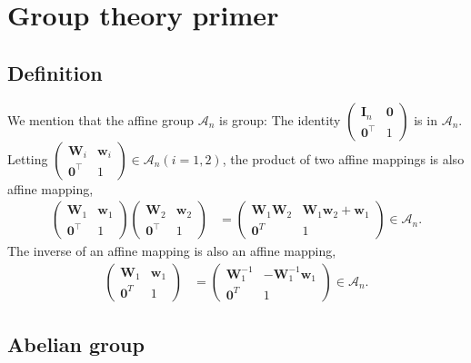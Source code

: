 \section{\label{sec:group_primer}Group theory primer}

\subsection{Definition}

We mention that the affine group $\mathcal{A}_{n}$ is group:
The identity $ \begin{pmatrix} \bm{I}_{n} & \bm{0} \\ \bm{0}^{\top} & 1 \end{pmatrix}$ is in $\mathcal{A}_{n}$.
Letting $\begin{pmatrix} \bm{W}_{i} & \bm{w}_{i} \\ \bm{0}^{\top} & 1 \end{pmatrix} \in \mathcal{A}_{n} (i=1,2)$, the product of two affine mappings is also affine mapping,
\begin{align}
  \begin{pmatrix} \bm{W}_{1} & \bm{w}_{1} \\ \bm{0}^{\top} & 1 \end{pmatrix} \begin{pmatrix} \bm{W}_{2} & \bm{w}_{2} \\ \bm{0}^{\top} & 1 \end{pmatrix}
    &=
    \begin{pmatrix}
      \bm{W}_{1} \bm{W}_{2} & \bm{W}_{1} \bm{w}_{2} + \bm{w}_{1} \\
      \bm{0}^{T} & 1
    \end{pmatrix}
    \in \mathcal{A}_{n}.
\end{align}
The inverse of an affine mapping is also an affine mapping,
\begin{align}
  \begin{pmatrix} \bm{W}_{1} & \bm{w}_{1} \\ \bm{0}^{T} & 1 \end{pmatrix}
  &=
  \begin{pmatrix} \bm{W}_{1}^{-1} & -\bm{W}_{1}^{-1}\bm{w}_{1} \\ \bm{0}^{T} & 1 \end{pmatrix} \in \mathcal{A}_{n}.
\end{align}


\subsection{Abelian group}

